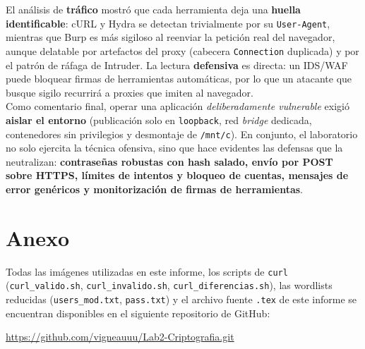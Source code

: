 \documentclass[letter,12pt]{article}
\begin{document}
El análisis de \textbf{tráfico} mostró que cada herramienta deja una \textbf{huella identificable}: cURL y Hydra se detectan trivialmente por su \texttt{User-Agent}, mientras que Burp es más sigiloso al reenviar la petición real del navegador, aunque delatable por artefactos del proxy (cabecera \texttt{Connection} duplicada) y por el patrón de ráfaga de Intruder. La lectura \textbf{defensiva} es directa: un IDS/WAF puede bloquear firmas de herramientas automáticas, por lo que un atacante que busque sigilo recurrirá a proxies que imiten al navegador. \\


Como comentario final, operar una aplicación \emph{deliberadamente vulnerable} exigió \textbf{aislar el entorno} (publicación solo en \texttt{loopback}, red \emph{bridge} dedicada, contenedores sin privilegios y desmontaje de \texttt{/mnt/c}). En conjunto, el laboratorio no solo ejercita la técnica ofensiva, sino que hace evidentes las defensas que la neutralizan: \textbf{contraseñas robustas con hash salado, envío por POST sobre HTTPS, límites de intentos y bloqueo de cuentas, mensajes de error genéricos y monitorización de firmas de herramientas}. \\


\newpage
\section*{Anexo}

Todas las imágenes utilizadas en este informe, los scripts de \texttt{curl} (\texttt{curl\_valido.sh}, \texttt{curl\_invalido.sh}, \texttt{curl\_diferencias.sh}), las wordlists reducidas (\texttt{users\_mod.txt}, \texttt{pass.txt}) y el archivo fuente \texttt{.tex} de este informe se encuentran disponibles en el siguiente repositorio de GitHub:

\begin{center}
\url{https://github.com/vigneauuu/Lab2-Criptografia.git}
\end{center}
\end{document}
